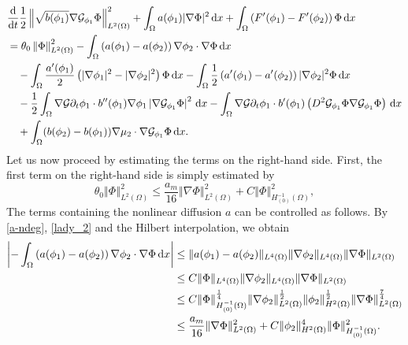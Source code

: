\documentclass[11pt,reqno]{amsart}
\theoremstyle{remark}
\newcommand \norm[1] {\left\Vert #1\right\Vert}
\def\G{\mathcal{G}}
\def\d{{\rm d}}
\def\ddt{\frac{\d}{\d t}}
\numberwithin{equation}{section}
\def\d{{\rm d}}
\begin{document}
\begin{align}
&\ddt \frac{1}{2} \norm{\sqrt{b(\phi_1)}\nabla \G_{\phi_1} \Phi}_{L^2(\Omega)}^2
+ \int_\Omega a(\phi_1) |\nabla \Phi |^2 \, \d x
 +
  \int_\Omega \left( F'(\phi_1)-F'(\phi_2) \right)   \Phi \, \d x
  \notag
\\
&=   \theta_0 \norm{\Phi}_{L^2(\Omega)}^2
 - \int_\Omega \left( a(\phi_1)-a(\phi_2)\right) \nabla \phi_2 \cdot \nabla \Phi \, \d x
 \notag
 \\
 &\quad -\int_\Omega \frac{a'(\phi_1)}{2}  \left( |\nabla \phi_1|^2-|\nabla \phi_2|^2\right) \Phi
 \, \d x
 - \int_\Omega \frac12  \left( a'(\phi_1)-a'(\phi_2)\right) | \nabla \phi_2|^2 \Phi \, \d x
 \notag
 \\
 &\quad
 -\frac12 \int_\Omega \nabla \G \partial_t \phi_1 \cdot b''(\phi_1) \nabla \phi_1 \left| \nabla \G_{\phi_1} \Phi \right|^2 \, \d x
 -
  \int_\Omega \nabla \G \partial_t \phi_1 \cdot  b'(\phi_1) \left( D^2 \G_{\phi_1} \Phi \nabla \G_{\phi_1} \Phi \right) \, \d x
  \notag
  \\
  &\quad  + \int_\Omega (b(\phi_2)-b(\phi_1)) \nabla \mu_2 \cdot \nabla \G_{\phi_1} \Phi \, \d x.
  \label{diff-rel-1}
 \end{align}
Let us now proceed by estimating the terms on the right-hand side.
First, the first term on the right-hand side is simply estimated by
\begin{equation*}
\label{I_4}
\theta_0 \norm{\Phi}_{L^2(\Omega)}^2 \leq
\frac{a_m}{16} \norm{\nabla \Phi}_{L^2(\Omega)}^2
 +C
\norm{ \Phi }_{H^{-1}_{(0)}(\Omega)}^2\!,
\end{equation*}
The terms containing the nonlinear diffusion $a$ can be controlled as follows.
By \eqref{a-ndeg}, \eqref{lady_2} and the Hilbert interpolation, we obtain 
\begin{align*}
\left|  - \int_\Omega \left( a(\phi_1)-a(\phi_2)\right) \nabla \phi_2 \cdot \nabla \Phi \, \d x \right|
&\leq \| a(\phi_1)-a(\phi_2)\|_{L^4(\Omega)} \| \nabla \phi_2\|_{L^4(\Omega)}
\| \nabla \Phi\|_{L^2(\Omega)}
\\
&\leq C \| \Phi\|_{L^4(\Omega)} \| \nabla \phi_2\|_{L^4(\Omega)}
\| \nabla \Phi\|_{L^2(\Omega)}
\\
&\leq C \| \Phi\|_{H^{-1}_{(0)}(\Omega)}^\frac14
 \| \nabla \phi_2\|_{L^2(\Omega)}^\frac12  \| \phi_2\|_{H^2(\Omega)}^\frac12
\| \nabla \Phi\|_{L^2(\Omega)}^\frac74
\\
& \leq \frac{a_m}{16}\| \nabla \Phi\|_{L^2(\Omega)}^2
+C  \| \phi_2\|_{H^2(\Omega)}^4  \| \Phi\|_{H^{-1}_{(0)}(\Omega)}^2.
\end{align*}
\end{document}
